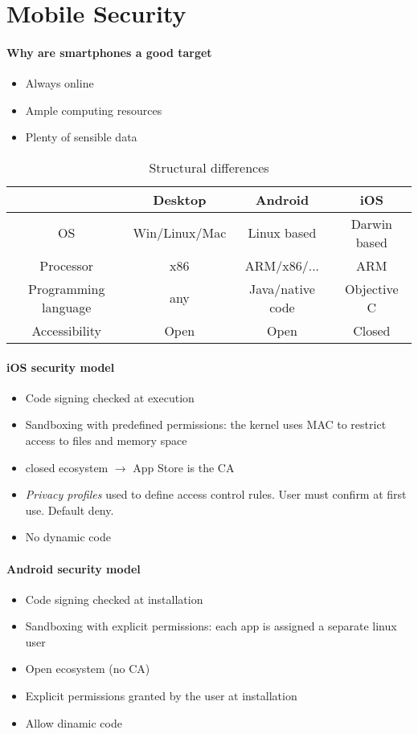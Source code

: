 \documentclass{article}
\begin{document}
\section{Mobile Security}
\paragraph{Why are smartphones a good target}
\begin{itemize}
\item Always online
\item Ample computing resources
\item Plenty of sensible data
\end{itemize}
\begin{table}[h]
\begin{tabular}{|c||c|c|c|}
\hline
&Desktop&Android&iOS\\
\hline\hline
OS&Win/Linux/Mac&Linux based&Darwin based\\
\hline
Processor&x86&ARM/x86/...&ARM\\
\hline
Programming language&any&Java/native code&Objective C\\
\hline
Accessibility&Open&Open&Closed\\
\hline
\end{tabular}
\caption{Structural differences}
\end{table}
\paragraph{iOS security model}
\begin{itemize}
\item Code signing checked at execution
\item Sandboxing with predefined permissions: the kernel uses MAC to restrict access to files and memory space
\item closed ecosystem $\rightarrow$ App Store is the CA
\item \textit{Privacy profiles} used to define access control rules. User must confirm at first use. Default deny.
\item No dynamic code
\end{itemize}
\paragraph{Android security model}
\begin{itemize}
\item Code signing checked at installation
\item Sandboxing with explicit permissions: each app is assigned a separate linux user
\item Open ecosystem (no CA)
\item Explicit permissions granted by the user at installation
\item Allow dinamic code
\end{itemize}
\end{document}
